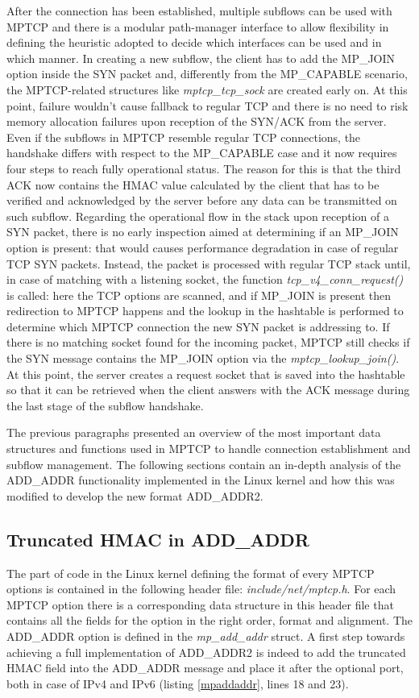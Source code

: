 After the connection has been established, multiple subflows can be used with MPTCP and there is a modular path-manager interface to allow flexibility in defining the heuristic adopted to decide which interfaces can be used and in which manner. In creating a new subflow, the client has to add the MP\_JOIN option inside the SYN packet and, differently from the MP\_CAPABLE scenario, the MPTCP-related structures like \textit{mptcp\_tcp\_sock} are created early on. At this point, failure wouldn't cause fallback to regular TCP and there is no need to risk memory allocation failures upon reception of the SYN/ACK from the server. Even if the subflows in MPTCP resemble regular TCP connections, the handshake differs with respect to the MP\_CAPABLE case and it now requires four steps to reach fully operational status. The reason for this is that the third ACK now contains the HMAC value calculated by the client that has to be verified and acknowledged by the server before any data can be transmitted on such subflow. 
Regarding the operational flow in the stack upon reception of a SYN packet, there is no early inspection aimed at determining if an MP\_JOIN option is present: that would causes performance degradation in case of regular TCP SYN packets. Instead, the packet is processed with regular TCP stack until, in case of matching with a listening socket, the function \textit{tcp\_v4\_conn\_request()} is called: here the TCP options are scanned, and if MP\_JOIN is present then redirection to MPTCP happens and the lookup in the hashtable is performed to determine which MPTCP connection the new SYN packet is addressing to. If there is no matching socket found for the incoming packet, MPTCP still checks if the SYN message contains the MP\_JOIN option via the \textit{mptcp\_lookup\_join()}. At this point, the server creates a request socket that is saved into the hashtable so that it can be retrieved when the client answers with the ACK message during the last stage of the subflow handshake.

The previous paragraphs presented an overview of the most important data structures and functions used in MPTCP to handle connection establishment and subflow management. The following sections contain an in-depth analysis of the ADD\_ADDR functionality implemented in the Linux kernel and how this was modified to develop the new format ADD\_ADDR2.

\subsection{Truncated HMAC in ADD\_ADDR}
\label{hmacinaddaddr}
The part of code in the Linux kernel defining the format of every MPTCP options is contained in the following header file: \textit{include/net/mptcp.h}. For each MPTCP option there is a corresponding data structure in this header file that contains all the fields for the option in the right order, format and alignment. The ADD\_ADDR option is defined in the \textit{mp\_add\_addr} struct. A first step towards achieving a full implementation of ADD\_ADDR2 is indeed to add the truncated HMAC field into the ADD\_ADDR message and place it after the optional port, both in case of IPv4 and IPv6 (listing \ref{mpaddaddr}, lines 18 and 23).


